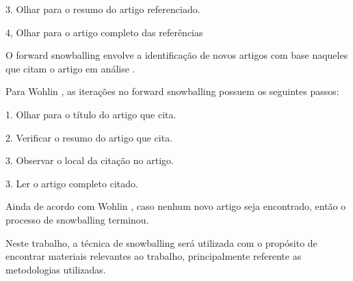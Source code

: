 3. Olhar para o resumo do artigo referenciado.

4, Olhar para o artigo completo das referências

O forward snowballing envolve a identificação de novos artigos com base naqueles que citam o artigo em análise \cite{wohlin2014guidelines}.

Para Wohlin \cite{wohlin2014guidelines}, as iterações no forward snowballing possuem os seguintes passos:

1. Olhar para o título do artigo que cita.

2. Verificar o resumo do artigo que cita.

3. Observar o local da citação no artigo.

3. Ler o artigo completo citado.

Ainda de acordo com Wohlin \cite{wohlin2014guidelines}, caso nenhum novo artigo seja encontrado, então o processo de snowballing terminou.

Neste trabalho, a técnica de snowballing será utilizada com o propósito de encontrar materiais relevantes ao trabalho, principalmente referente as metodologias utilizadas.


